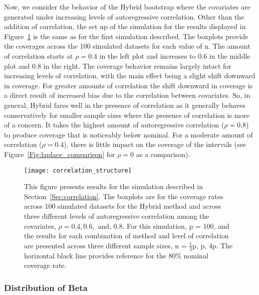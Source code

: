 Now, we consider the behavior of the Hybrid bootstrap where the covariates are generated under increasing levels of autoregressive correlation. Other than the addition of correlation, the set up of the simulation for the results displayed in Figure~\ref{Fig:correlation_structure} is the same as for the first simulation described. The boxplots provide the coverages across the 100 simulated datasets for each value of n. The amount of correlation starts at $\rho = 0.4$ in the left plot and increases to $0.6$ in the middle plot and $0.8$ in the right. The coverage behavior remains largely intact for increasing levels of correlation, with the main effect being a slight shift downward in coverage. For greater amounts of correlation the shift downward in coverage is a direct result of increased bias due to the correlation between covariates. So, in general, Hybrid fares well in the presence of correlation as it generally behaves conservatively for smaller sample sizes where the presence of correlation is more of a concern. It takes the highest amount of autoregressive correlation ($\rho = 0.8$) to produce coverage that is noticeably below nominal. For a moderate amount of correlation ($\rho = 0.4$), there is little impact on the coverage of the intervals (see Figure~\ref{Fig:laplace_comparison} for $\rho = 0$ as a comparison).

\begin{figure}[hbtp]
  \begin{center}
  \texttt{[image: correlation\_structure]}
  \caption{\label{Fig:correlation_structure} This figure presents results for the simulation described in Section~\ref{Sec:correlation}. The boxplots are for the coverage rates across 100 simulated datasets for the Hybrid method and across three different levels of autoregressive correlation among the covariates, $\rho = 0.4, 0.6, \text{ and, } 0.8$. For this simulation, p = 100, and the results for each combination of method and level of correlation are presented across three different sample sizes, n = $\frac{1}{2}$p, p, 4p. The horizontal black line provides reference for the 80\% nominal coverage rate.}
  \end{center}
\end{figure}

\subsubsection{Distribution of Beta}\label{Sec:Distribution}

